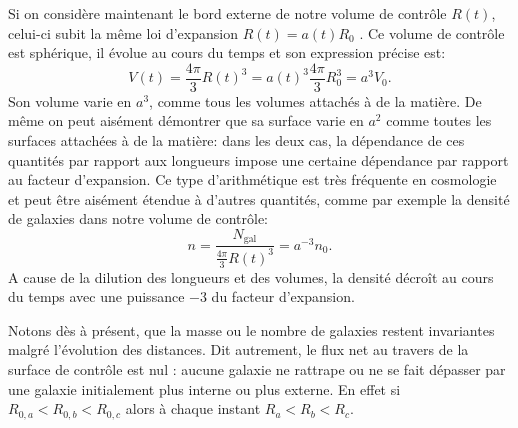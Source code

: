 Si on considère maintenant le bord externe de notre volume de contrôle $R(t)$, celui-ci subit la même loi d'expansion $R(t)=a(t)R_0$ . Ce volume de contrôle est sphérique, il évolue au cours du temps et son expression précise est:
\begin{equation}
V(t)=\frac{4\pi}{3} R(t)^3 = a(t)^3\frac{4\pi}{3} R_0^3= a^3 V_0.
\end{equation}
Son volume varie en $a^3$, comme tous les volumes attachés à de la matière. De même on peut aisément démontrer que sa surface varie en $a^2$ comme toutes les surfaces attachées à de la matière: dans les deux cas, la dépendance de ces quantités par rapport aux longueurs impose une certaine dépendance par rapport au facteur d'expansion. Ce type d'arithmétique est très fréquente en cosmologie et peut être aisément étendue à d'autres quantités, comme par exemple la densité de galaxies dans notre volume de contrôle:
\begin{equation}
n=\frac{N_\mathrm{gal}}{\frac{4\pi}{3} R(t)^3}=a^{-3} n_0.
\end{equation}
A cause de la dilution des longueurs et des volumes, la densité décroît au cours du temps avec une puissance $-3$ du facteur d'expansion. 

Notons dès à présent, que la masse ou le nombre de galaxies restent invariantes malgré l'évolution des distances. Dit autrement, le flux net au travers de la surface de contrôle est nul : aucune galaxie ne rattrape ou ne se fait dépasser par une galaxie initialement plus interne ou plus externe. En effet si $R_{0,a}<R_{0,b}<R_{0,c}$ alors à chaque instant $R_a<R_b<R_c$.

